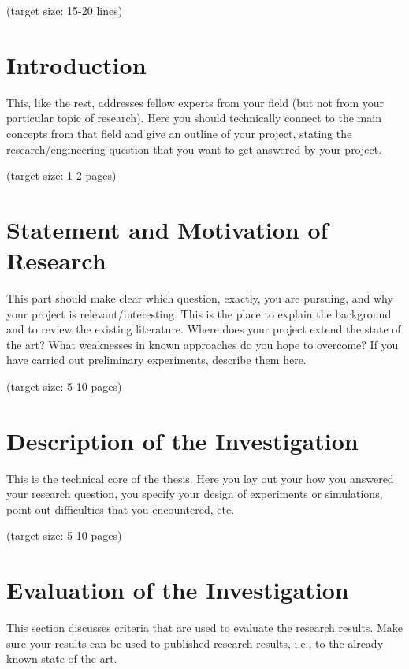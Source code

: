 \documentclass[a4paper,11pt,oneside]{article}
\begin{document}
(target size: 15-20 lines)

\newpage
\tableofcontents

\clearpage
{}

\section{Introduction}

This, like the rest, addresses fellow experts from your field (but
not from your particular topic of research). Here you should
technically connect to the main concepts from that field and give an
outline of your project, stating the research/engineering question
that you want to get answered by your project.

(target size: 1-2 pages)

\section{Statement and Motivation of Research}

This part should make clear which question, exactly, you are
pursuing, and why your project is relevant/interesting. This is the
place to explain the background and to review the existing
literature. Where does your project extend the state of the art?
What weaknesses in known approaches do you hope to overcome? If you
have carried out preliminary experiments, describe them here.

(target size: 5-10 pages)

\section{Description of the Investigation}

This is the technical core of the thesis. Here you lay out your how
you answered your research question, you specify your design of
experiments or simulations, point out difficulties that you
encountered, etc.

(target size: 5-10 pages)

\section{Evaluation of the Investigation}

This section discusses criteria that are used to evaluate the
research results. Make sure your results can be used to published
research results, i.e., to the already known state-of-the-art.
\end{document}
